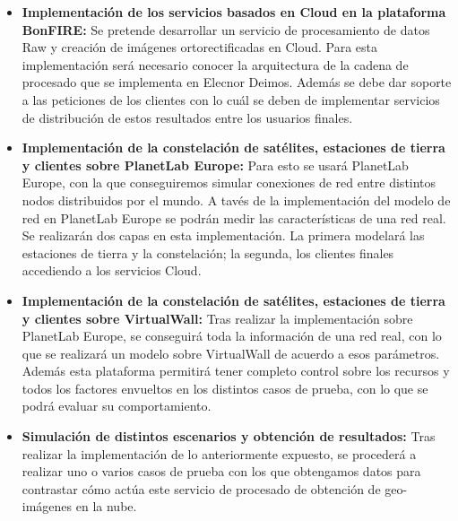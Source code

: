 \begin{itemize}

\item \textbf{Implementación de los servicios basados en Cloud en la plataforma BonFIRE:}  Se pretende desarrollar un servicio de procesamiento de datos Raw y creación de imágenes ortorectificadas en Cloud. Para esta implementación será necesario conocer la arquitectura de la cadena de procesado que se implementa en Elecnor Deimos. Además se debe dar soporte a las peticiones de los clientes con lo cuál se deben de implementar servicios de distribución de estos resultados entre los usuarios finales.

\item \textbf{Implementación de la constelación de satélites, estaciones de tierra y clientes sobre PlanetLab Europe:}  Para esto se usará PlanetLab Europe, con la que conseguiremos simular conexiones de red entre distintos nodos distribuidos por el mundo.
A tavés de la implementación del modelo de red en PlanetLab Europe se podrán medir las características de una red real. Se realizarán dos capas en esta implementación. La primera modelará las estaciones de tierra y la constelación; la segunda, los clientes finales accediendo a los servicios Cloud.

\item \textbf{Implementación de la constelación de satélites, estaciones de tierra y clientes sobre VirtualWall:} Tras realizar la implementación sobre PlanetLab Europe, se conseguirá toda la información de una red real, con lo que se realizará un modelo sobre VirtualWall de acuerdo a esos parámetros. Además esta plataforma permitirá tener completo control sobre los recursos y todos los factores envueltos en los distintos casos de prueba, con lo que se podrá evaluar su comportamiento.

\item \textbf{Simulación de distintos escenarios y obtención de resultados:} Tras realizar la implementación de lo anteriormente expuesto, se procederá a realizar uno o varios casos de prueba con los que obtengamos datos para contrastar cómo actúa este servicio de procesado de obtención de geo-imágenes en la nube.



\end{itemize}








